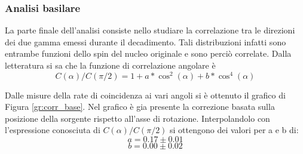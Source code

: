 \subsubsection{Analisi basilare}

La parte finale dell'analisi consiste nello studiare la correlazione tra le direzioni dei due gamma emessi durante il decadimento. Tali distribuzioni infatti sono entrambe funzioni dello spin del nucleo originale e sono perciò correlate. Dalla letteratura si sa che la funzione di correlazione angolare è 
$$ C(\alpha)/C(\pi/2) = 1+a*\cos^2(\alpha)+b*\cos^4(\alpha)$$

Dalle misure della rate di coincidenza ai vari angoli si è ottenuto il grafico di Figura \ref{gr:corr_base}. Nel grafico è gia presente la correzione basata sulla posizione della sorgente rispetto all'asse di rotazione. Interpolandolo con l'espressione conosciuta di $C(\alpha)/C(\pi/2)$ si ottengono dei valori per a e b di:
$$a=0.17\pm 0.01$$
$$b=0.00\pm 0.02$$


